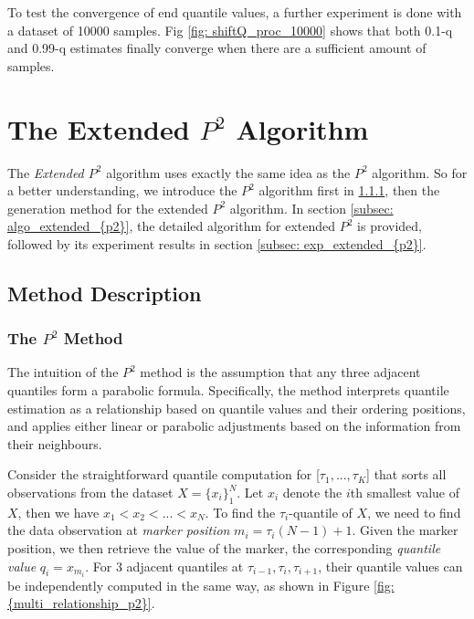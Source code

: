  To test the convergence of end quantile values, a further experiment is done with a dataset of 10000 samples. Fig \ref{fig: shiftQ_proc_10000} shows that both 0.1-q and 0.99-q estimates finally converge when there are a sufficient amount of samples.
\pagebreak
\section{The Extended $P^2$ Algorithm}
\label{sec: multi_{p2}}

The \textit{Extended $P^2$} algorithm\cite{raatikainenSequentialProcedureSimultaneous1993} uses exactly the same idea as the $P^2$ algorithm\cite{jainP2AlgorithmDynamic1985}. So for a better understanding, we introduce the $P^2$ algorithm first in \ref{subsubsec: description_{p2}}, then the generation method for the extended $P^2$ algorithm.
In section \ref{subsec: algo_extended_{p2}}, the detailed algorithm for extended $P^2$ is provided, followed by its experiment results in section \ref{subsec: exp_extended_{p2}}.

\subsection{Method Description}
\subsubsection{The $P^2$ Method}
\label{subsubsec: description_{p2}}

The intuition of the $P^2$ method is the assumption that any three adjacent quantiles form a parabolic formula.
Specifically, the method interprets quantile estimation as a relationship based on quantile values and their ordering positions, and applies either linear or parabolic adjustments based on the information from their neighbours.

Consider the straightforward quantile computation for [$\tau_1, ..., \tau_K$] that sorts all observations from the dataset $X = \{x_i\}^N_1$. Let $x_i$ denote the $i$th smallest value of $X$, then we have $x_1 < x_2 < ... < x_N$. 
To find the $\tau_i$-quantile of $X$, we need to find the data observation at \textit{marker position} $m_i = \tau_i (N-1) + 1$. Given the marker position, we then retrieve the value of the marker, the corresponding \textit{quantile value} $q_i = x_{m_i}$. 
For 3 adjacent quantiles at $\tau_{i-1}, \tau_i, \tau_{i+1}$, their quantile values can be independently computed in the same way, as shown in Figure \ref{fig: {multi_relationship_p2}}.

